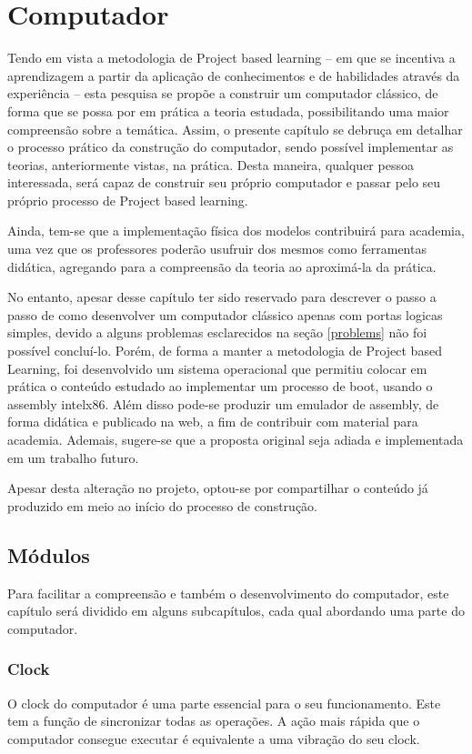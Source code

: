 \section{Computador} 
Tendo em vista a metodologia de Project based learning – em que se incentiva a aprendizagem a partir da aplicação de conhecimentos e de habilidades através da experiência – esta pesquisa se propõe a construir um computador clássico, de forma que se possa por em prática a teoria estudada, possibilitando uma maior compreensão sobre a temática. Assim, o presente capítulo se debruça em detalhar o processo prático da construção do computador, sendo possível implementar as teorias, anteriormente vistas, na prática. Desta maneira, qualquer pessoa interessada, será capaz de construir seu próprio computador e passar pelo seu próprio processo de Project based learning. 

Ainda, tem-se que a implementação física dos modelos contribuirá para academia, uma vez que os professores poderão usufruir dos mesmos como ferramentas didática, agregando para a compreensão da teoria ao aproximá-la da prática. 

No entanto, apesar desse capítulo ter sido reservado para descrever o passo a passo de como desenvolver um computador clássico apenas com portas logicas simples, devido a alguns problemas esclarecidos na seção \ref{problems} não foi possível concluí-lo. Porém, de forma a manter a metodologia de Project based Learning, foi desenvolvido um sistema operacional que permitiu colocar em prática o conteúdo estudado ao implementar um processo de boot, usando o assembly intelx86. Além disso pode-se produzir um emulador de assembly, de forma didática e publicado na web,  a fim de contribuir com material para academia. Ademais, sugere-se que a proposta original seja adiada e implementada em um trabalho futuro. 

Apesar desta alteração no projeto, optou-se por compartilhar o conteúdo já produzido em meio ao início do processo de construção. 

\subsection{Módulos}
Para facilitar a compreensão e também o desenvolvimento do computador, este capítulo será dividido em alguns subcapítulos, cada qual abordando uma parte do computador.

\subsubsection{Clock}
O clock do computador é uma parte essencial para o seu funcionamento. Este tem a função de sincronizar todas as operações. A ação mais rápida que o computador consegue executar é equivalente a uma vibração do seu clock.

